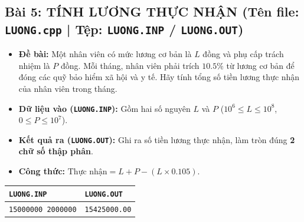\documentclass[11pt,a4paper]{article}
\begin{document}
\subsection*{\color{AsianDarkBlue}\small Bài 5: TÍNH LƯƠNG THỰC NHẬN (Tên file: \texttt{LUONG.cpp} | Tệp: \texttt{LUONG.INP} / \texttt{LUONG.OUT})}
\begin{itemize}
    \setlength{\itemsep}{0.5pt}
    \footnotesize
    \item \textbf{Đề bài:} Một nhân viên có mức lương cơ bản là $L$ đồng và phụ cấp trách nhiệm là $P$ đồng. Mỗi tháng, nhân viên phải trích $10.5\%$ từ lương cơ bản để đóng các quỹ bảo hiểm xã hội và y tế. Hãy tính tổng số tiền lương thực nhận của nhân viên trong tháng.
    \item \textbf{Dữ liệu vào (\texttt{LUONG.INP}):} Gồm hai số nguyên $L$ và $P$ ($10^6 \le L \le 10^8$, $0 \le P \le 10^7$).
    \item \textbf{Kết quả ra (\texttt{LUONG.OUT}):} Ghi ra số tiền lương thực nhận, làm tròn đúng \textbf{2 chữ số thập phân}.
    \item \textbf{Công thức:} $\text{Thực nhận} = L + P - (L \times 0.105)$.
\end{itemize}
\vspace{-2mm}
\begin{center}
\footnotesize
\begin{tabular}{|p{7.8cm}|p{7.8cm}|}
\hline
\textbf{\texttt{LUONG.INP}} & \textbf{\texttt{LUONG.OUT}} \\
\hline
\texttt{15000000 2000000} & \texttt{15425000.00} \\
\hline
\end{tabular}
\end{center}

\vspace{-2mm}
\end{document}
